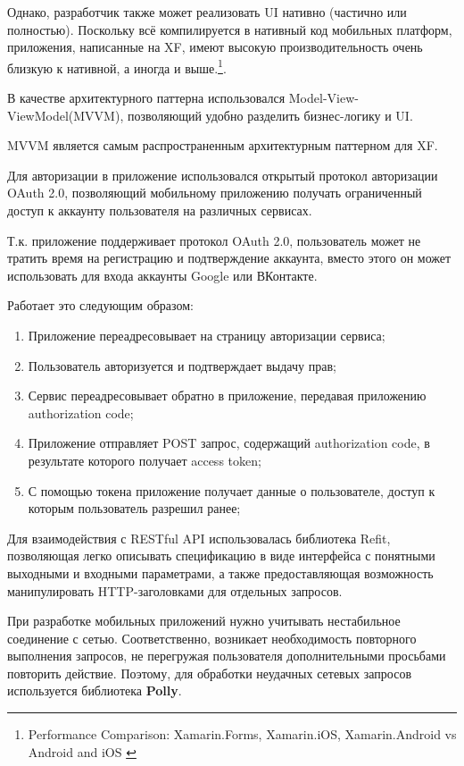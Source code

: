 \documentclass[14pt]{matmex-diploma-custom}
\begin{document}
        Однако, разработчик также может реализовать UI нативно (частично или полностью).
        Поскольку всё компилируется в нативный код мобильных платформ, приложения, написанные на XF, имеют высокую производительность очень близкую к нативной, а иногда и выше.\footnote{Performance Comparison: Xamarin.Forms, Xamarin.iOS, Xamarin.Android vs Android and iOS \cite{perf_compar_2}}.
        
        В качестве архитектурного паттерна использовался Model-View-ViewModel(MVVM)\cite{MVVM_wiki},
        позволяющий удобно разделить бизнес-логику и UI.
        
        MVVM является самым распространенным архитектурным паттерном для XF.
        
        Для авторизации в приложение использовался открытый протокол авторизации OAuth 2.0, позволяющий мобильному приложению получать ограниченный доступ к аккаунту пользователя на различных сервисах.
        
        Т.к. приложение поддерживает протокол OAuth 2.0, пользователь может не тратить время на регистрацию и подтверждение аккаунта, вместо этого он может использовать для входа аккаунты Google или ВКонтакте.
        
        Работает это следующим образом:
        \begin{enumerate}
        \item Приложение переадресовывает на страницу авторизации сервиса;
        \item Пользователь авторизуется и подтверждает выдачу прав;
        \item Сервис переадресовывает обратно в приложение, передавая приложению authorization code;
        \item Приложение отправляет POST запрос, содержащий authorization code, в результате которого получает access token;
        \item С помощью токена приложение получает данные о пользователе, доступ к которым пользователь разрешил ранее;
        \end{enumerate}
        
        Для взаимодействия с RESTful API использовалась библиотека Refit,
        позволяющая легко описывать спецификацию в виде интерфейса с понятными выходными и входными параметрами, а также предоставляющая возможность манипулировать HTTP-заголовками для отдельных запросов.
        
        При разработке мобильных приложений нужно учитывать нестабильное соединение с сетью.
        Соответственно, возникает необходимость повторного выполнения запросов,
        не перегружая пользователя дополнительными просьбами повторить действие.
        Поэтому, для обработки неудачных сетевых запросов используется библиотека \textbf{Polly}\cite{polly_github}.
        
\end{document}
